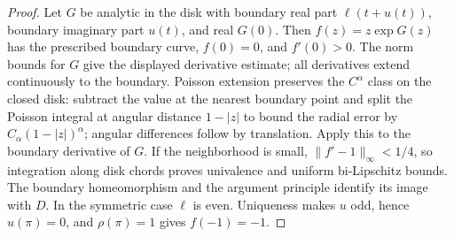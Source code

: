 \documentclass[11pt]{article}
\begin{document}
\begin{proof}
Let $G$ be analytic in the disk with boundary real part
$\ell(t+u(t))$, boundary imaginary part $u(t)$, and real $G(0)$.
Then $f(z)=z\exp G(z)$ has the prescribed boundary curve,
$f(0)=0$, and $f'(0)>0$. The norm bounds for $G$ give the
displayed derivative estimate; all derivatives extend
continuously to the boundary. Poisson extension preserves the
$C^\alpha$ class on the closed disk: subtract the value at the
nearest boundary point and split the Poisson integral at angular
distance $1-|z|$ to bound the radial error by
$C_\alpha(1-|z|)^\alpha$; angular differences follow by translation.
Apply this to the boundary derivative of $G$.
If the neighborhood is small,
$\|f'-1\|_\infty<1/4$, so integration along disk chords proves
univalence and uniform bi-Lipschitz bounds. The boundary
homeomorphism and the argument principle identify its image
with $D$. In the symmetric case $\ell$ is even. Uniqueness
makes $u$ odd, hence $u(\pi)=0$, and $\rho(\pi)=1$ gives
$f(-1)=-1$.
\end{proof}
\end{document}
